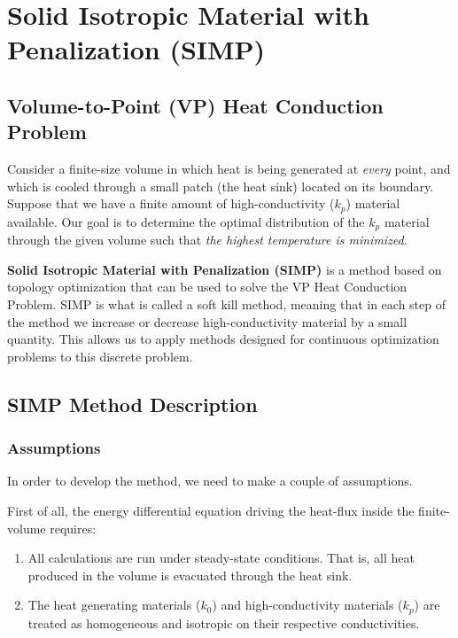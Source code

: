 \section{Solid Isotropic Material with Penalization (SIMP)}

\subsection*{Volume-to-Point (VP) Heat Conduction Problem}

Consider a finite-size volume in which heat is being generated at \textit{every} point, and which is cooled through a small patch (the heat sink) located on its boundary. Suppose that we have a finite amount of high-conductivity ($k_p$) material available. Our goal is to determine the optimal distribution of the $k_p$ material through the given volume such that \textit{the highest temperature is minimized}.

{\color{tiananmen}\textbf{Solid Isotropic Material with Penalization (SIMP)}} is a method based on topology optimization that can be used to solve the VP Heat Conduction Problem. SIMP is what is called a {\color{baystate}soft kill method}, meaning that in each step of the method we increase or decrease high-conductivity material by a small quantity. This allows us to apply methods designed for continuous optimization problems to this discrete problem.

\subsection{SIMP Method Description}

\subsubsection*{Assumptions}
In order to develop the method, we need to make a couple of assumptions.

First of all, the energy differential equation driving the heat-flux inside the finite-volume requires:
\begin{enumerate}
	\item All calculations are run under {\color{baystate}steady-state conditions}. That is, all heat produced in the volume is evacuated through the heat sink.
	\item The heat generating materials ($k_0$) and high-conductivity materials ($k_p$) are treated as {\color{baystate}homogeneous} and {\color{baystate}isotropic} on their respective conductivities.
\end{enumerate}

